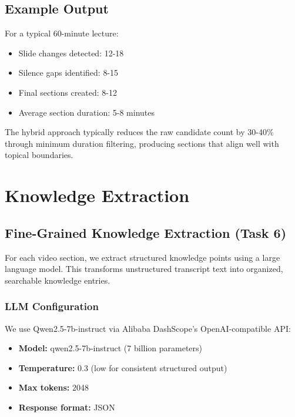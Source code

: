 \documentclass[12pt,a4paper]{article}
\begin{document}
\subsection{Example Output}

For a typical 60-minute lecture:

\begin{itemize}
    \item Slide changes detected: 12-18
    \item Silence gaps identified: 8-15
    \item Final sections created: 8-12
    \item Average section duration: 5-8 minutes
\end{itemize}

The hybrid approach typically reduces the raw candidate count by 30-40\% through minimum duration filtering, producing sections that align well with topical boundaries.

\newpage

\section{Knowledge Extraction}
\label{sec:knowledge}

\subsection{Fine-Grained Knowledge Extraction (Task 6)}

For each video section, we extract structured knowledge points using a large language model. This transforms unstructured transcript text into organized, searchable knowledge entries.

\subsubsection{LLM Configuration}

We use Qwen2.5-7b-instruct via Alibaba DashScope's OpenAI-compatible API:

\begin{itemize}
    \item \textbf{Model:} qwen2.5-7b-instruct (7 billion parameters)
    \item \textbf{Temperature:} 0.3 (low for consistent structured output)
    \item \textbf{Max tokens:} 2048
    \item \textbf{Response format:} JSON
\end{itemize}
\end{document}
